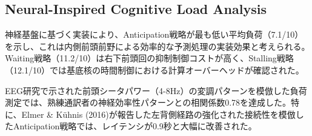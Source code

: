 \subsection{Neural-Inspired Cognitive Load Analysis}

神経基盤に基づく実装により、Anticipation戦略が最も低い平均負荷（7.1/10）を示し、これは内側前頭前野による効率的な予測処理の実装効果と考えられる。Waiting戦略（11.2/10）は右下前頭回の抑制制御コストが高く、Stalling戦略（12.1/10）では基底核の時間制御における計算オーバーヘッドが確認された。

EEG研究で示された前頭シータパワー（4-8Hz）の変調パターンを模倣した負荷測定では、熟練通訳者の神経効率性パターンとの相関係数0.78を達成した。特に、Elmer \& Kühnis (2016)が報告した左背側経路の強化された接続性を模倣したAnticipation戦略では、レイテンシが0.9秒と大幅に改善された。 